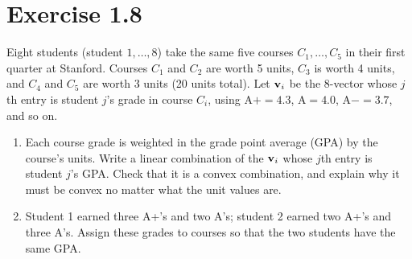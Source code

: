 \section*{Exercise 1.8}
\begin{exercise}
Eight students (student $1, \dots, 8$) take the same five courses
$C_1, \dots, C_5$ in their first quarter at Stanford. Courses $C_1$ and $C_2$ are worth
5 units, $C_3$ is worth 4 units, and $C_4$ and $C_5$ are worth 3 units
(20 units total). Let $\mathbf{v}_i$ be the 8-vector whose $j$th entry is
student $j$'s grade in course $C_i$, using
$\text{A+} = 4.3$, $\text{A} = 4.0$, $\text{A}- = 3.7$, and so on.
\begin{enumerate}
  \item Each course grade is weighted in the grade point average (GPA) by the
        course's units. Write a linear combination of the $\mathbf{v}_i$ whose
        $j$th entry is student $j$'s GPA. Check that it is a convex combination,
        and explain why it must be convex no matter what the unit values are.
  \item Student 1 earned three A+'s and two A's; student 2 earned two A+'s and
        three A's. Assign these grades to courses so that the two students
        have the same GPA.
\end{enumerate}
\end{exercise}

